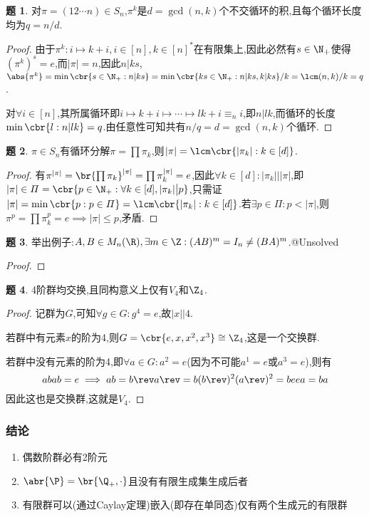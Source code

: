 \documentclass{article}
\theoremstyle{definition}
\newtheorem{exercise}{题}[section]
\begin{document}
\begin{exercise}
    对$\pi=(12\cdots n)\in S_n$,$\pi^k$是$d=\gcd(n,k)$个不交循环的积,且每个循环长度均为$q=n/d$.
\end{exercise}
\begin{proof}
    由于$\pi^k:i\mapsto k+i, i\in [n], k\in [n]^*$在有限集上,因此必然有$s\in \N_+$使得$(\pi^k)^s=e$,而$|\pi|=n$,因此$n|ks$,$\abs{\pi^k}=\min\cbr{s\in \N_+:n|ks}=\min\cbr{ks\in \N_+:n|ks,k|ks}/k=\lcm(n,k)/k=q$.

    对$\forall i\in [n]$,其所属循环即$i\mapsto k+i\mapsto\cdots\mapsto lk+i\equiv_n i$,即$n|lk$,而循环的长度$\min\cbr{l:n|lk}=q$.由任意性可知共有$n/q=d=\gcd(n,k)$个循环.
\end{proof}

\begin{exercise}
    $\pi\in S_n$有循环分解$\pi=\prod \pi_k$,则$|\pi|=\lcm\cbr{|\pi_k|:k\in [d]}$.
\end{exercise}
\begin{proof}
    有$\pi^{|\pi|}=\br{\prod \pi_k}^{|\pi|}=\prod \pi_k^{|\pi|}=e$,因此$\forall k\in [d]: |\pi_k|\big| |\pi|$,即$|\pi|\in \varPi=\cbr{p\in \N_+: \forall k\in [d], |\pi_k|\big| p}$,只需证$|\pi|=\min \cbr{p:p\in \varPi}=\lcm\cbr{|\pi_k|:k\in [d]}$.若$\exists p\in \varPi:p<|\pi|$,则$\pi^p=\prod \pi_k^p=e\implies |\pi|\leq p$,矛盾.
\end{proof}

\begin{exercise}
    举出例子:$A,B\in M_n(\R), \exists m\in \Z: (AB)^m=I_n\neq (BA)^m$.@Unsolved
\end{exercise}
\begin{proof}
    
\end{proof}

\begin{exercise}
    4阶群均交换,且同构意义上仅有$V_4$和$\Z_4$.
\end{exercise}
\begin{proof}
    记群为$G$,可知$\forall g\in G:g^4=e$,故$|x|\big| 4$.

    若群中有元素$x$的阶为4,则$G=\cbr{e,x,x^2,x^3}\cong \Z_4$,这是一个交换群.

    若群中没有元素的阶为4,即$\forall a\in G: a^2=e$(因为不可能$a^1=e$或$a^3=e$),则有
    $$abab=e\implies ab=b\rev a\rev=b(b\rev)^2(a\rev)^2=beea=ba$$
    因此这也是交换群,这就是$V_4$.
\end{proof}

\subsubsection{结论}
\begin{enumerate}
    \item 偶数阶群必有2阶元
    \item $\abr{\P}=\br{\Q_+,\cdot}$且没有有限生成集生成后者
    \item 有限群可以(通过Caylay定理)嵌入(即存在单同态)仅有两个生成元的有限群
\end{enumerate}
\end{document}
